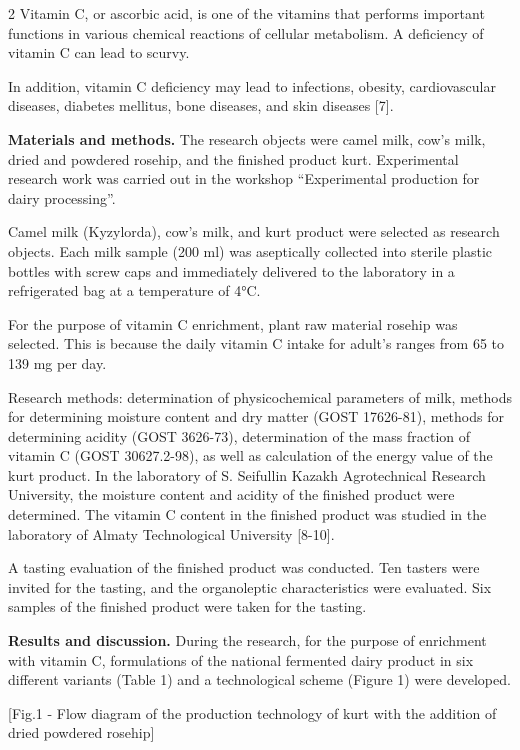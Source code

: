 \begin{multicols}{2}
Vitamin C, or ascorbic acid, is one of the vitamins that performs
important functions in various chemical reactions of cellular
metabolism. A deficiency of vitamin C can lead to scurvy.

In addition, vitamin C deficiency may lead to infections, obesity,
cardiovascular diseases, diabetes mellitus, bone diseases, and skin
diseases {[}7{]}.

{\bfseries Materials and methods.} The research objects were camel milk,
cow's milk, dried and powdered rosehip, and the finished product kurt.
Experimental research work was carried out in the workshop
``Experimental production for dairy processing''.

Camel milk (Kyzylorda), cow's milk, and kurt product were selected as
research objects. Each milk sample (200 ml) was aseptically collected
into sterile plastic bottles with screw caps and immediately delivered
to the laboratory in a refrigerated bag at a temperature of 4°C.

For the purpose of vitamin C enrichment, plant raw material rosehip was
selected. This is because the daily vitamin C intake for adult's ranges
from 65 to 139 mg per day.

Research methods: determination of physicoche\-mical parameters of milk,
methods for determining moisture content and dry matter (GOST 17626-81),
methods for determining acidity (GOST 3626-73), determination of the
mass fraction of vitamin C (GOST 30627.2-98), as well as calculation of
the energy value of the kurt product. In the laboratory of S. Seifullin
Kazakh Agrotechnical Research University, the moisture content and
acidity of the finished product were determined. The vitamin C content
in the finished product was studied in the laboratory of Almaty
Technological University {[}8-10{]}.

A tasting evaluation of the finished product was conducted. Ten tasters
were invited for the tasting, and the organoleptic characteristics were
evaluated. Six samples of the finished product were taken for the
tasting.

{\bfseries Results and discussion.} During the research, for the purpose of
enrichment with vitamin C, formulations of the national fermented dairy
product in six different variants (Table 1) and a technological scheme
(Figure 1) were developed.
\end{multicols}

[Fig.1 - Flow diagram of the production technology of kurt with the addition of dried powdered rosehip]

